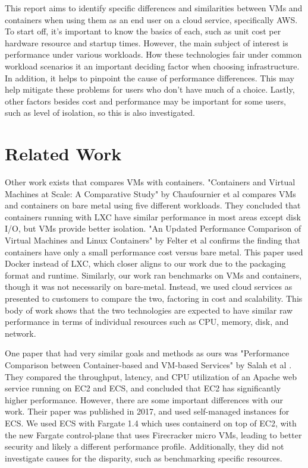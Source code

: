 \documentclass[11pt]{article}
\begin{document}
This report aims to identify specific differences and similarities between VMs and containers when using them as an end user on a cloud service, specifically AWS. To start off, it's important to know the basics of each, such as unit cost per hardware resource and startup times. However, the main subject of interest is performance under various workloads. How these technologies fair under common workload scenarios it an important deciding factor when choosing infrastructure. In addition, it helps to pinpoint the cause of performance differences. This may help mitigate these problems for users who don't have much of a choice. Lastly, other factors besides cost and performance may be important for some users, such as level of isolation, so this is also investigated.

\vspace{3mm} %


\section{Related Work}

Other work exists that compares VMs with containers. "Containers and Virtual Machines at Scale: A Comparative Study" by Chaufournier et al \cite{10.1145/2988336.2988337} compares VMs and containers on bare metal using five different workloads. They concluded that containers running with LXC have similar performance in most areas except disk I/O, but VMs provide better isolation. "An Updated Performance Comparison of Virtual Machines and Linux Containers" by Felter et al \cite{7095802} confirms the finding that containers have only a small performance cost versus bare metal. This paper used Docker instead of LXC, which closer aligns to our work due to the packaging format and runtime. Similarly, our work ran benchmarks on VMs and containers, though it was not necessarily on bare-metal. Instead, we used cloud services as presented to customers to compare the two, factoring in cost and scalability. This body of work shows that the two technologies are expected to have similar raw performance in terms of individual resources such as CPU, memory, disk, and network.

One paper that had very similar goals and methods as ours was "Performance Comparison between Container-based and VM-based Services" by Salah et al \cite{7899408}. They compared the throughput, latency, and CPU utilization of an Apache web service running on EC2 and ECS, and concluded that EC2 has significantly higher performance. However, there are some important differences with our work. Their paper was published in 2017, and used self-managed instances for ECS. We used ECS with Fargate 1.4 which uses containerd on top of EC2, with the new Fargate control-plane that uses Firecracker micro VMs, leading to better security and likely a different performance profile. Additionally, they did not investigate causes for the disparity, such as benchmarking specific resources.
\end{document}
